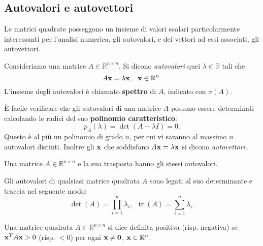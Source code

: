 \subsection{Autovalori e autovettori}
Le matrici quadrate posseggono un insieme di valori scalari particolarmente interessanti per l'analisi numerica, gli autovalori, e dei vettori ad essi associati, gli autovettori.

\begin{definition}
	Consideriamo una matrice $A\in \mathbb{R}^{n\times n}$.
  Si dicono \textit{autovalori} quei $\lambda \in \mathbb{R}$ tali che
	\begin{equation*}
		A\mathbf{x} =\lambda \mathbf{x} ,\ \ \mathbf{x} \in \mathbb{R}^{n}.
	\end{equation*}
	L'insieme degli autovalori è chiamato \textbf{spettro} di $A$, indicato con $\sigma ( A)$.

	È facile verificare che gli autovalori di una matrice $A$ possono essere determinati calcolando le radici del suo \textbf{polinomio caratteristico}:
	\begin{equation*}
		p_{A}( \lambda ) =\operatorname{det}( A-\lambda I) =0.
	\end{equation*}
	Questo è al più un polinomio di grado $n$, per cui vi saranno al massimo $n$ autovalori distinti.
  Inoltre gli $\mathbf{x}$ che soddisfano $A\mathbf{x} =\lambda \mathbf{x}$ si dicono \textit{autovettori}.
\end{definition}
\begin{theorem}
	Una matrice $A\in \mathbb{R}^{n\times n}$ e la sua trasposta hanno gli stessi autovalori.
\end{theorem}
\begin{theorem}
	Gli autovalori di qualsiasi matrice quadrata $A$ sono legati al suo determinante e traccia nel seguente modo:
	\begin{equation*}
		\operatorname{det}( A) =\prod ^{n}_{i=1} \lambda _{i} ,\ \ \operatorname{tr}( A) =\sum ^{n}_{i=1} \lambda _{i} .
	\end{equation*}
\end{theorem}
\begin{definition}
	Una matrice quadrata $A\in \mathbb{R} ^{n\times n} $ si dice definita positiva (risp. negativa) se $\mathbf{x}^{T} A\mathbf{x} > 0$ (risp. $< 0$) per ogni $\mathbf{x} \neq \mathbf{0}$, $\mathbf{x} \in \mathbb{R}^{n}$.
	\label{def:matrice-definita-positiva-negativa}
\end{definition}
